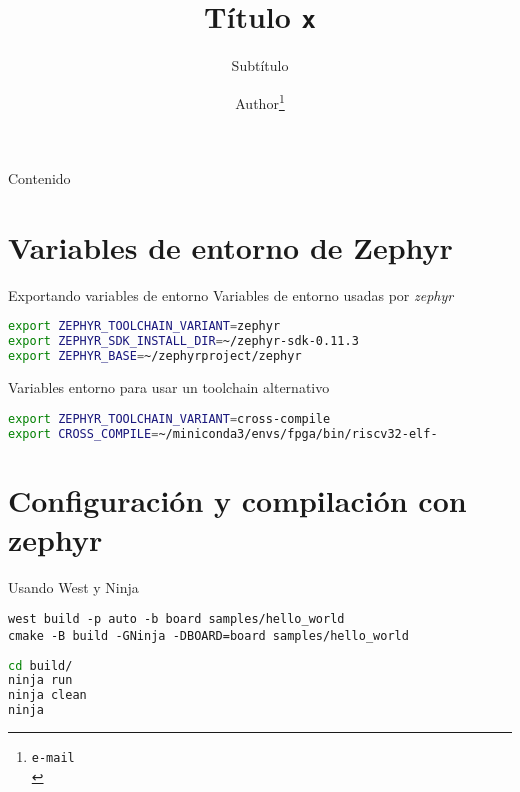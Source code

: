 \documentclass{beamer}
\title{Título \texttt{x}}
\subtitle{Subtítulo}
\author{Author\footnote{\texttt{e-mail}\\}}
\begin{document}
\begin{frame}
  \maketitle
\end{frame}

\begin{frame}{Contenido}
  \tableofcontents
\end{frame}

\section{Variables de entorno de Zephyr}

\begin{frame}[fragile]{Exportando variables de entorno}
  Variables de entorno usadas por \textit{zephyr}
\begin{lstlisting}[language=Bash, tabsize=2, label=_, basicstyle=\small]
export ZEPHYR_TOOLCHAIN_VARIANT=zephyr
export ZEPHYR_SDK_INSTALL_DIR=~/zephyr-sdk-0.11.3
export ZEPHYR_BASE=~/zephyrproject/zephyr
\end{lstlisting}

Variables entorno para usar un toolchain alternativo

\begin{lstlisting}[language=Bash, tabsize=2, label=code_, basicstyle=\footnotesize]
export ZEPHYR_TOOLCHAIN_VARIANT=cross-compile
export CROSS_COMPILE=~/miniconda3/envs/fpga/bin/riscv32-elf-
\end{lstlisting}
\end{frame}

\section{Configuración y compilación con zephyr}

\begin{frame}[fragile]{Usando West y Ninja}
  \begin{lstlisting}
west build -p auto -b board samples/hello_world
cmake -B build -GNinja -DBOARD=board samples/hello_world
  \end{lstlisting}
\begin{lstlisting}[language=Bash, tabsize=2, label=code_1, basicstyle=\small]
cd build/
ninja run
ninja clean
ninja 
\end{lstlisting}

\end{frame}
\end{document}
